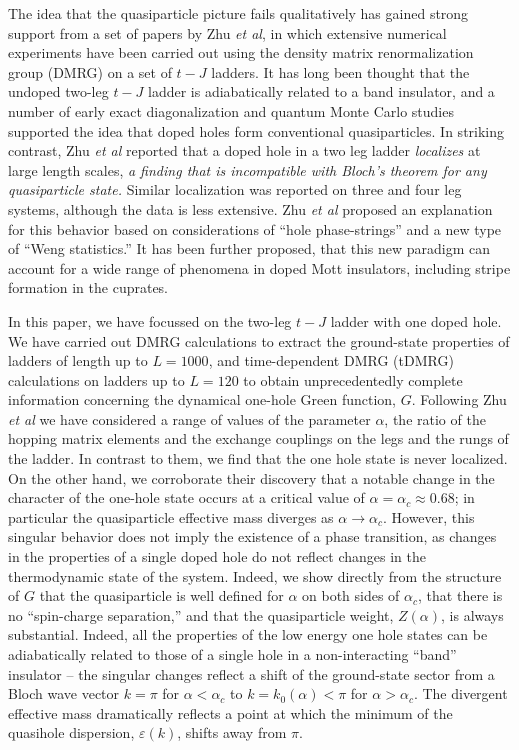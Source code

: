 \documentclass[aps,prb,twocolumn]{revtex4}
\begin{document}
The idea that the quasiparticle picture fails qualitatively 
has gained strong support from a set of papers by Zhu {\it et al}\cite{Zhu1,Zhu2,Zhu3, Zhu4}, 
in which extensive numerical experiments have been carried out using the density matrix 
renormalization group (DMRG)\cite{dmrg} on a set of $t-J$ 
ladders.
It has long been thought  that the undoped two-leg $t-J$ ladder is adiabatically related to a band insulator, and
 a number of early exact diagonalization\cite{Troyer} and quantum Monte Carlo\cite{Brunner}  studies 
 supported the idea that doped holes 
 form conventional quasiparticles.  In striking contrast, Zhu  {\it et al} 
reported that a doped hole in a two leg ladder {\it localizes} at large length
scales, {\it a finding that is incompatible with Bloch's theorem for any
quasiparticle state.} Similar localization was reported on three and four leg systems, although 
the data is less extensive.  Zhu  {\it et al} 
proposed an explanation for this behavior based on considerations of ``hole phase-strings'' 
and a new type of ``Weng statistics.''
It has been further proposed,\cite{Zaanen} that this new paradigm 
can account for a wide range of phenomena in doped Mott insulators, 
including stripe formation in the cuprates.

In this paper, we have focussed on the  two-leg $t-J$ ladder with one doped
hole.  We have carried out DMRG calculations to extract the ground-state
properties of  ladders of length up to $L=1000$, and time-dependent DMRG\cite{tdmrg1,tdmrg2,tdmrg3}
(tDMRG) calculations on ladders up to $L=120$ to obtain unprecedentedly
complete information concerning the dynamical one-hole Green function, $G$.
Following Zhu {\it et al} we have considered  a range of values of the
parameter $\alpha$, the ratio of the hopping matrix elements and the exchange couplings on the legs and
the rungs of the ladder.  In contrast to them, we find that the one hole state
is never localized. On the other hand, we corroborate their discovery that a
notable change in the character of the one-hole state  occurs at a critical
value of $\alpha=\alpha_c\approx 0.68$; in particular  the quasiparticle
effective mass diverges as $\alpha\to \alpha_c$.  However, this singular
behavior does not imply the existence of a phase transition, as changes in the
properties of a single doped hole do not reflect changes in the thermodynamic
state of the system.  Indeed, we show directly from the structure of $G$ that
the quasiparticle is well defined for  $\alpha$ on both sides of $\alpha_c$, that %
there is no   ``spin-charge separation,''
and that the quasiparticle weight, $Z(\alpha)$, is  always substantial.  Indeed,
all the properties of the low energy one hole states can be adiabatically
related to those of a single hole in a non-interacting ``band'' insulator --
the singular changes reflect a shift of the ground-state sector  from a Bloch
wave vector $k=\pi$ for $\alpha < \alpha_c$ to $k =k_0(\alpha) <\pi$ for
$\alpha>\alpha_c$.  The divergent effective mass %
dramatically reflects a point at
which the minimum of the quasihole dispersion, $\varepsilon(k)$, shifts 
away from
$\pi$. 
\end{document}
